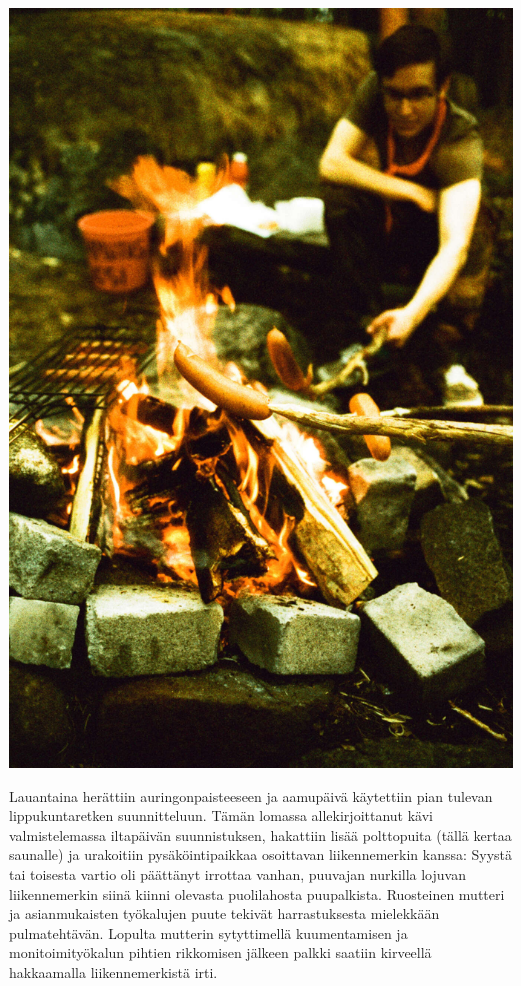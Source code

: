 \begin{multicols}{2}
\noindent\includegraphics[width=\linewidth]{assets/vene05}

Lauantaina herättiin auringonpaisteeseen ja aamupäivä käytettiin pian tulevan lippukuntaretken suunnitteluun. Tämän lomassa allekirjoittanut kävi valmistelemassa iltapäivän suunnistuksen, hakattiin lisää polttopuita (tällä kertaa saunalle) ja urakoitiin pysäköintipaikkaa osoittavan liikennemerkin kanssa: Syystä tai toisesta vartio oli päättänyt irrottaa vanhan, puuvajan nurkilla lojuvan liikennemerkin siinä kiinni olevasta puolilahosta puupalkista. Ruosteinen mutteri ja asianmukaisten työkalujen puute tekivät harrastuksesta mielekkään pulmatehtävän. Lopulta mutterin sytyttimellä kuumentamisen ja monitoimityökalun pihtien rikkomisen jälkeen palkki saatiin kirveellä hakkaamalla liikennemerkistä irti.


\end{multicols}
